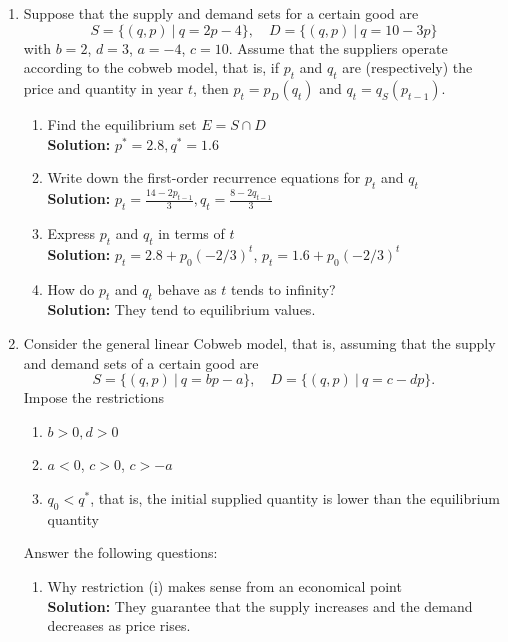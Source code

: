 \documentclass{article}
\begin{document}
\begin{enumerate}[leftmargin = 0.5cm, label = \arabic*., rightmargin = 0.2cm]

    \item Suppose that the supply and demand sets for a certain good are
    \[
    S = \{(q, p)\ |\ q = 2p - 4\}, \quad D = \{(q, p)\ |\ q = 10 - 3p\}
    \]
    with $b = 2$, $d = 3$, $a = -4$, $c = 10$. Assume that the suppliers operate according to the cobweb model, that is, if $p_t$ and $q_t$ are (respectively) the price and quantity in year $t$, then $p_t = p_D(q_t)$ and $q_t = q_S(p_{t-1})$.
    
    \begin{enumerate}[leftmargin = 0.5cm, label = (\alph*), rightmargin = 0.2cm]
        \item Find the equilibrium set \(E = S \cap D\) \\
        \textbf{Solution:} \( p^* = 2.8, q^* = 1.6 \)
        
        \item Write down the first-order recurrence equations for \(p_t\) and \(q_t\) \\
        \textbf{Solution:} \( p_t = \frac{14 - 2p_{t-1}}{3}, q_t = \frac{8 - 2q_{t-1}}{3} \)

        \item Express \(p_t\) and \(q_t\) in terms of \(t\) \\
        \textbf{Solution:} $p_t = 2.8 + p_0(-2/3)^t$, $p_t = 1.6 + p_0(-2/3)^t$

        \item How do \(p_t\) and \(q_t\) behave as \(t\) tends to infinity? \\
        \textbf{Solution:} They tend to equilibrium values.
    \end{enumerate}
    
    \item Consider the general linear Cobweb model, that is, assuming that the supply and demand sets of a certain good are
    $$
    S = \{(q, p)\ |\ q = bp - a\}, \quad D = \{(q, p)\ |\ q = c - dp\}.
    $$
    Impose the restrictions 
    \begin{enumerate}[leftmargin = 0.5cm, label = (\roman*), rightmargin = 0.2cm]
        \item $b > 0, d > 0$
        \item $a < 0$, $c > 0$, $c > -a$
        \item $q_0 < q^*$, that is, the initial supplied quantity is lower than the equilibrium quantity
    \end{enumerate}
    Answer the following questions:
    \begin{enumerate}[leftmargin = 0.5cm, label = (\alph*), rightmargin = 0.2cm]
        \item Why restriction (i) makes sense from an economical point \\
        \textbf{Solution:} They guarantee that the supply increases and the demand decreases as price rises.


\end{enumerate}
\end{enumerate}
\end{document}
